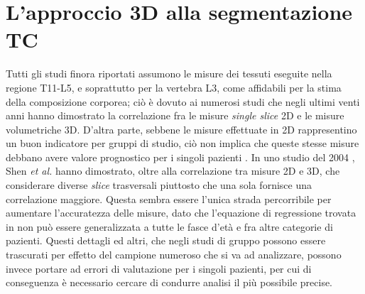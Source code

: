 \section{L'approccio 3D alla segmentazione TC}
Tutti gli studi finora riportati assumono le misure dei tessuti eseguite nella regione T11-L5, e soprattutto per la vertebra L3, come affidabili per la stima della composizione corporea; ciò è dovuto ai numerosi studi che negli ultimi venti anni hanno dimostrato la correlazione fra le misure \textit{single slice} 2D e le misure volumetriche 3D. D’altra parte, sebbene le misure effettuate in 2D rappresentino un buon indicatore per gruppi di studio, ciò non implica che queste stesse misure debbano avere valore prognostico per i singoli pazienti \cite{Ma2021}. In uno studio del 2004 \cite{Shen2004}, Shen \textit{et al.} hanno dimostrato, oltre alla correlazione tra misure 2D e 3D, che considerare diverse \textit{slice} trasversali piuttosto che una sola fornisce una correlazione maggiore. Questa sembra essere l’unica strada percorribile per aumentare l’accuratezza delle misure, dato che l’equazione di regressione trovata in \cite{Shen2004} non può essere generalizzata a tutte le fasce d’età e fra altre categorie di pazienti. Questi dettagli ed altri, che negli studi di gruppo possono essere trascurati per effetto del campione numeroso che si va ad analizzare, possono invece portare ad errori di valutazione per i singoli pazienti, per cui di conseguenza è necessario cercare di condurre analisi il più possibile precise.

